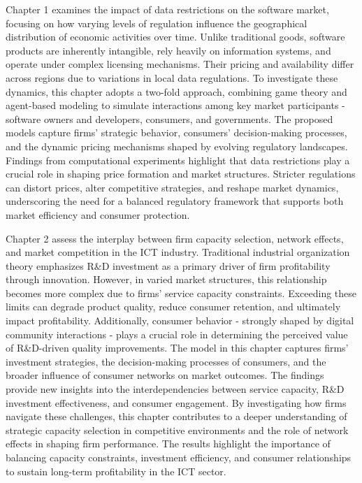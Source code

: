 \documentclass[11pt]{article}
\begin{document}
Chapter 1 examines the impact of data restrictions on the software market, focusing on how varying levels of regulation influence the geographical distribution of economic activities over time. Unlike traditional goods, software products are inherently intangible, rely heavily on information systems, and operate under complex licensing mechanisms. Their pricing and availability differ across regions due to variations in local data regulations.
To investigate these dynamics, this chapter adopts a two-fold approach, combining game theory and agent-based modeling to simulate interactions among key market participants - software owners and developers, consumers, and governments. The proposed models capture firms’ strategic behavior, consumers’ decision-making processes, and the dynamic pricing mechanisms shaped by evolving regulatory landscapes.
Findings from computational experiments highlight that data restrictions play a crucial role in shaping price formation and market structures. Stricter regulations can distort prices, alter competitive strategies, and reshape market dynamics, underscoring the need for a balanced regulatory framework that supports both market efficiency and consumer protection.
\vspace{5mm}

Chapter 2 assess the interplay between firm capacity selection, network effects, and market competition in the ICT industry. Traditional industrial organization theory emphasizes R\&D investment as a primary driver of firm profitability through innovation. However, in varied market structures, this relationship becomes more complex due to firms' service capacity constraints. Exceeding these limits can degrade product quality, reduce consumer retention, and ultimately impact profitability. Additionally, consumer behavior - strongly shaped by digital community interactions - plays a crucial role in determining the perceived value of R\&D-driven quality improvements. The model in this chapter captures firms' investment strategies, the decision-making processes of consumers, and the broader influence of consumer networks on market outcomes.
The findings provide new insights into the interdependencies between service capacity, R\&D investment effectiveness, and consumer engagement. By investigating how firms navigate these challenges, this chapter contributes to a deeper understanding of strategic capacity selection in competitive environments and the role of network effects in shaping firm performance. The results highlight the importance of balancing capacity constraints, investment efficiency, and consumer relationships to sustain long-term profitability in the ICT sector.
\end{document}
